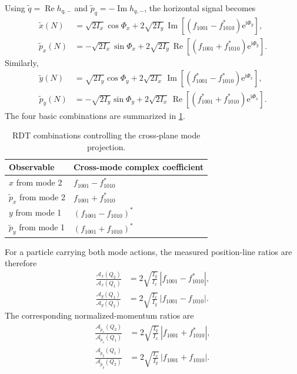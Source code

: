 \documentclass[11pt,a4paper]{article}
\newcommand{\ii}{\mathrm{i}}
\newcommand{\e}{\mathrm{e}}
\newcommand{\Ree}{\operatorname{Re}}
\newcommand{\Imm}{\operatorname{Im}}
\newcommand{\fminus}{f_{1001}}
\newcommand{\fplus}{f_{1010}}
\begin{document}
Using $\widetilde q=\Ree h_{q,-}$ and $\widetilde p_q=-\Imm h_{q,-}$, the horizontal signal becomes
\begin{align}
 \widetilde x(N)
 &=\sqrt{2I_x}\cos\Phi_x
 +2\sqrt{2I_y}\,
 \Imm\!\left[(\fminus-\fplus^{*})\e^{\ii\Phi_y}\right],
 \label{eq:xtilde-rdt}\\
 \widetilde p_x(N)
 &=-\sqrt{2I_x}\sin\Phi_x
 +2\sqrt{2I_y}\,
 \Ree\!\left[(\fminus+\fplus^{*})\e^{\ii\Phi_y}\right].
 \label{eq:pxtilde-rdt}
\end{align}
Similarly,
\begin{align}
 \widetilde y(N)
 &=\sqrt{2I_y}\cos\Phi_y
 +2\sqrt{2I_x}\,
 \Imm\!\left[(\fminus^{*}-\fplus^{*})\e^{\ii\Phi_x}\right],
 \label{eq:ytilde-rdt}\\
 \widetilde p_y(N)
 &=-\sqrt{2I_y}\sin\Phi_y
 +2\sqrt{2I_x}\,
 \Ree\!\left[(\fminus^{*}+\fplus^{*})\e^{\ii\Phi_x}\right].
 \label{eq:pytilde-rdt}
\end{align}
The four basic combinations are summarized in \cref{tab:rdt-combinations}.

\begin{table}[htbp]
\centering
\caption{RDT combinations controlling the cross-plane mode projection.}
\label{tab:rdt-combinations}
\begin{tabular}{@{}ll@{}}
\toprule
Observable & Cross-mode complex coefficient\\
\midrule
$x$ from mode 2 & $\fminus-\fplus^{*}$\\
$\widetilde p_x$ from mode 2 & $\fminus+\fplus^{*}$\\
$y$ from mode 1 & $(\fminus-\fplus)^{*}$\\
$\widetilde p_y$ from mode 1 & $(\fminus+\fplus)^{*}$\\
\bottomrule
\end{tabular}
\end{table}

For a particle carrying both mode actions, the measured position-line ratios are therefore
\begin{align}
 \frac{\mathcal A_x(Q_2)}{\mathcal A_x(Q_1)}
 &=2\sqrt{\frac{I_y}{I_x}}\,|\fminus-\fplus^{*}|,
 \label{eq:measured-x-rdt-ratio}\\
 \frac{\mathcal A_y(Q_1)}{\mathcal A_y(Q_2)}
 &=2\sqrt{\frac{I_x}{I_y}}\,|\fminus-\fplus|.
 \label{eq:measured-y-rdt-ratio}
\end{align}
The corresponding normalized-momentum ratios are
\begin{align}
 \frac{\mathcal A_{\widetilde p_x}(Q_2)}{\mathcal A_{\widetilde p_x}(Q_1)}
 &=2\sqrt{\frac{I_y}{I_x}}\,|\fminus+\fplus^{*}|,
 \label{eq:measured-px-rdt-ratio}\\
 \frac{\mathcal A_{\widetilde p_y}(Q_1)}{\mathcal A_{\widetilde p_y}(Q_2)}
 &=2\sqrt{\frac{I_x}{I_y}}\,|\fminus+\fplus|.
 \label{eq:measured-py-rdt-ratio}
\end{align}
\end{document}
